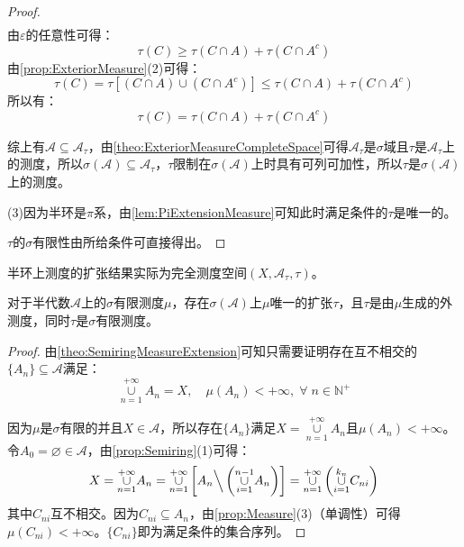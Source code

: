 \begin{proof}
\begin{align*}
	\end{align*}
	由$\varepsilon$的任意性可得：
	\begin{equation*}
		\tau(C)\geqslant\tau(C\cap A)+\tau(C\cap A^c)
	\end{equation*}
	由\cref{prop:ExteriorMeasure}(2)可得：
	\begin{equation*}
		\tau(C)=\tau[(C\cap A)\cup(C\cap A^c)]\leqslant\tau(C\cap A)+\tau(C\cap A^c)
	\end{equation*}
	所以有：
	\begin{equation*}
		\tau(C)=\tau(C\cap A)+\tau(C\cap A^c)
	\end{equation*}\par
	综上有$\mathscr{A}\subseteq\mathscr{A}_\tau$，由\cref{theo:ExteriorMeasureCompleteSpace}可得$\mathscr{A}_\tau$是$\sigma$域且$\tau$是$\mathscr{A}_\tau$上的测度，所以$\sigma(\mathscr{A})\subseteq\mathscr{A}_\tau$，$\tau$限制在$\sigma(\mathscr{A})$上时具有可列可加性，所以$\tau$是$\sigma(\mathscr{A})$上的测度。\par
	(3)因为半环是$\pi$系，由\cref{lem:PiExtensionMeasure}可知此时满足条件的$\tau$是唯一的。\par
	$\tau$的$\sigma$有限性由所给条件可直接得出。
\end{proof}
\begin{note}
	半环上测度的扩张结果实际为完全测度空间$(X,\mathscr{A}_\tau,\tau)$。
\end{note}
\begin{corollary}\label{cor:SemiringMeasureExtension}
	对于半代数$\mathscr{A}$上的$\sigma$有限测度$\mu$，存在$\sigma(\mathscr{A})$上$\mu$唯一的扩张$\tau$，且$\tau$是由$\mu$生成的外测度，同时$\tau$是$\sigma$有限测度。
\end{corollary}
\begin{proof}
	由\cref{theo:SemiringMeasureExtension}可知只需要证明存在互不相交的$\{A_n\}\subseteq\mathscr{A}$满足：
	\begin{equation*}
		\underset{n=1}{\overset{+\infty}{\cup}}A_n=X,\quad\mu(A_n)<+\infty,\;\forall\;n\in\mathbb{N}^+
	\end{equation*}\par
	因为$\mu$是$\sigma$有限的并且$X\in\mathscr{A}$，所以存在$\{A_n\}$满足$X=\underset{n=1}{\overset{+\infty}{\cup}}A_n$且$\mu(A_n)<+\infty$。令$A_0=\varnothing\in\mathscr{A}$，由\cref{prop:Semiring}(1)可得：
	\begin{equation*}
		X=\underset{n=1}{\overset{+\infty}{\cup}}A_n=\underset{n=1}{\overset{+\infty}{\cup}}\left[A_n\Big\backslash\left(\underset{i=1}{\overset{n-1}{\cup}}A_n\right)\right]=\underset{n=1}{\overset{+\infty}{\cup}}\left(\underset{i=1}{\overset{k_n}{\cup}}C_{ni}\right)
	\end{equation*}
	其中$C_{ni}$互不相交。因为$C_{ni}\subseteq A_n$，由\cref{prop:Measure}(3)（单调性）可得$\mu(C_{ni})<+\infty$。$\{C_{ni}\}$即为满足条件的集合序列。
\end{proof}
